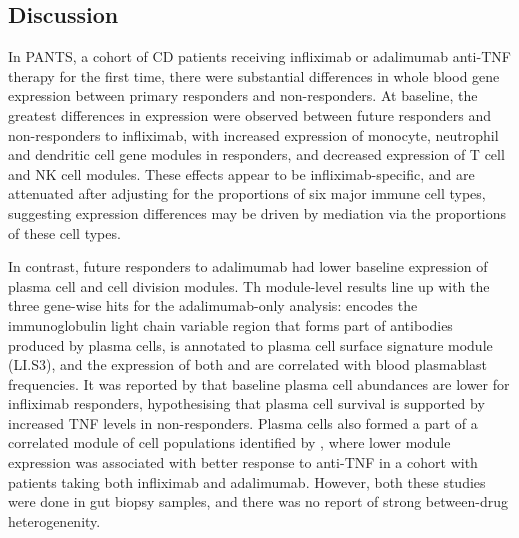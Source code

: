 \begin{outline}


\section{Discussion}

In \gls{PANTS}, a cohort of \gls{CD} patients receiving infliximab or adalimumab anti-TNF therapy for the first time,
there were substantial differences in whole blood gene expression between primary responders and non-responders.
At baseline, the greatest differences in expression were observed between future responders and non-responders to infliximab,
with increased expression of monocyte, neutrophil and dendritic cell gene modules in responders,
and decreased expression of T cell and NK cell modules.
These effects appear to be infliximab-specific, and are attenuated after adjusting for the proportions of six major immune cell types,
suggesting expression differences may be driven by mediation via the proportions of these cell types.

In contrast, future responders to adalimumab had lower baseline expression of plasma cell and cell division modules.
Th module-level results line up with the three gene-wise hits for the adalimumab-only analysis:
 encodes the immunoglobulin light chain variable region that forms part of antibodies produced by plasma cells,
 is annotated to plasma cell surface signature module (LI.S3\autocite{li2013MolecularSignaturesAntibody}), 
and the expression of both  and  are correlated with blood plasmablast frequencies\autocite{tsang2014GlobalAnalysesHuman}.
It was reported by \textcite{gaujoux2019CellcentredMetaanalysisReveals} that baseline plasma cell abundances are lower for infliximab responders,
hypothesising that plasma cell survival is supported by increased \gls{TNF} levels in non-responders.
Plasma cells also formed a part of a correlated module of cell populations identified by \autocite{martin2019SingleCellAnalysisCrohn},
where lower module expression was associated with better response to anti-\gls{TNF} in a cohort with patients taking both infliximab and adalimumab.
However, both these studies were done in gut biopsy samples, and there was no report of strong between-drug heterogenenity.


\end{outline}
